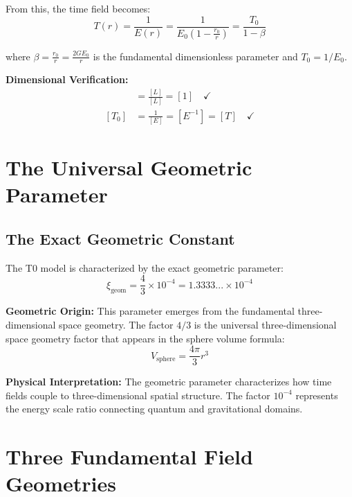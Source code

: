 \documentclass[12pt,a4paper]{report}
\newcommand{\rzero}{r_0}                  %
\newcommand{\xigeom}{\xi_{\text{geom}}}   %
\begin{document}
	From this, the time field becomes:
	\begin{equation}
		T(r) = \frac{1}{E(r)} = \frac{1}{E_0\left(1 - \frac{\rzero}{r}\right)} = \frac{T_0}{1 - \beta}
		\label{eq:time_field_solution}
	\end{equation}
	
	where $\beta = \frac{\rzero}{r} = \frac{2GE_0}{r}$ is the fundamental dimensionless parameter and $T_0 = 1/E_0$.
	
	\textbf{Dimensional Verification:}
	\begin{align}
		[\beta] &= \frac{[L]}{[L]} = [1] \quad \checkmark \\
		[T_0] &= \frac{1}{[E]} = [E^{-1}] = [T] \quad \checkmark
	\end{align}
	
	\section{The Universal Geometric Parameter}\label{sec:universal_geometric_parameter}
	
	\subsection{The Exact Geometric Constant}\label{subsec:exact_geometric_constant}
	
	The T0 model is characterized by the exact geometric parameter:
	\begin{equation}
		\boxed{\xigeom = \frac{4}{3} \times 10^{-4} = 1.3333... \times 10^{-4}}
		\label{eq:geometric_parameter}
	\end{equation}
	
	\textbf{Geometric Origin:} This parameter emerges from the fundamental three-dimensional space geometry. The factor $4/3$ is the universal three-dimensional space geometry factor that appears in the sphere volume formula:
	\begin{equation}
		V_{\text{sphere}} = \frac{4\pi}{3}r^3
	\end{equation}
	
	\textbf{Physical Interpretation:} The geometric parameter characterizes how time fields couple to three-dimensional spatial structure. The factor $10^{-4}$ represents the energy scale ratio connecting quantum and gravitational domains.
	
	\section{Three Fundamental Field Geometries}\label{sec:field_geometries}
	
\end{document}
